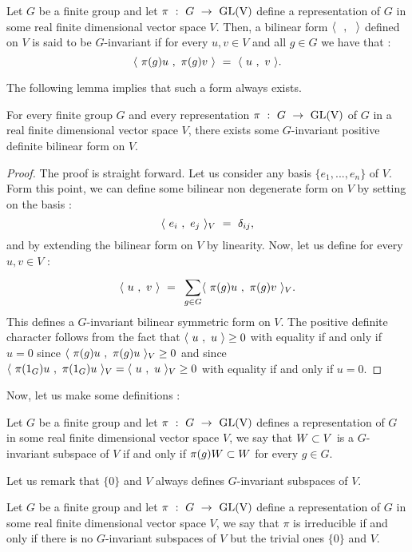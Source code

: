 \begin{definition}
	Let $G$ be a finite group and let $\pi \text{ }:\text{ } G\text{ }\rightarrow\text{ }\mbox{GL(V)}$ define a representation of $G$ in some real finite dimensional vector space $V$. Then, a bilinear form $\langle\text{ } \text{ },\text{ }\text{ }\rangle$ defined on $V$ is said to be $G$-invariant if for every $u,v\in V$ and all $g\in G$ we have that :
	\begin{equation}
	\langle\text{ } \pi(g)u\text{ },\text{ }\pi(g)v\text{ }\rangle\text{ }=\text{ } \langle\text{ } u\text{ },\text{ } v\text{ }\rangle.
	\end{equation}
\end{definition}
The following lemma implies that such a form always exists.
\begin{lemma}\label{existence of a g invariant non degenerate bilinear form on the representaion sapce}
	For every finite group $G$ and every representation $\pi \text{ }:\text{ } G\text{ }\rightarrow\text{ }\mbox{GL(V)}$ of $G$ in a real finite dimensional vector space $V$, there exists some $G$-invariant positive definite bilinear form on $V$.
\end{lemma}
\begin{proof}
	The proof is straight forward. Let us consider any basis $\{e_1,...,e_n\}$ of $V$. Form this point, we can define some bilinear non degenerate form on $V$ by setting on the basis :
	\begin{equation}
	\langle\text{ } e_i\text{ },\text{ } e_j\text{ }\rangle_V\text{ }=\text{ } \delta_{ij},
	\end{equation}
	and by extending the bilinear form on $V$ by linearity. Now, let us define for every $u,v\in V$ :
	\begin{equation}
	\langle\text{ } u\text{ },\text{ } v\text{ }\rangle\text{ }=\text{ } \sum\limits_{g\in G}^{}\langle\text{ } \pi(g)u\text{ },\text{ }\pi(g)v\text{ }\rangle_V.
	\end{equation}
	This defines a $G$-invariant bilinear symmetric form on $V$. The positive definite character follows from the fact that $\langle\text{ } u\text{ },\text{ } u\text{ }\rangle\geq 0$ with equality if and only if $u=0$ since $\langle\text{ } \pi(g)u\text{ },\text{ }\pi(g)u\text{ }\rangle_V\geq 0$ and since $\langle\text{ } \pi(1_G)u\text{ },\text{ }\pi(1_G)u\text{ }\rangle_V=\langle\text{ } u\text{ },\text{ } u\text{ }\rangle_V\geq 0$ with equality if and only if $u=0$.
\end{proof}
Now, let us make some definitions :
\begin{definition}
	Let $G$ be a finite group and let $\pi \text{ }:\text{ } G\text{ }\rightarrow\text{ }\mbox{GL(V)}$ defines a representation of $G$ in some real finite dimensional vector space $V$, we say that $W\subset V$ is a $G$-invariant subspace of $V$ if and only if $\pi(g)W\subset W$ for every $g\in G$.
\end{definition}
Let us remark that $\{0\}$ and $V$ always defines $G$-invariant subspaces of $V$.
\begin{definition}
	Let $G$ be a finite group and let $\pi \text{ }:\text{ } G\text{ }\rightarrow\text{ }\mbox{GL(V)}$ define a representation of $G$ in some real finite dimensional vector space $V$, we say that $\pi$ is irreducible if and only if there is no $G$-invariant subspaces of $V$ but the trivial ones $\{0\}$ and $V$.
\end{definition}
